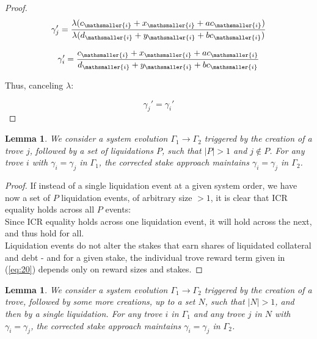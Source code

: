 \documentclass[reqno]{article}
\newtheorem{lemma}[theorem]{Lemma}
\begin{document}
\begin{proof}
\begin{equation} 
    \gamma_{j}'=\frac{\lambda(c_\mathsmaller{i} + x_\mathsmaller{i}+ac_\mathsmaller{i})}{\lambda(d_\mathsmaller{i}+y_\mathsmaller{i}+bc_\mathsmaller{i})}
\end{equation}

\begin{equation} 
    \gamma_{i}'=\frac{c_\mathsmaller{i}+x_\mathsmaller{i}+ac_\mathsmaller{i}}{d_\mathsmaller{i}+y_\mathsmaller{i}+bc_\mathsmaller{i}}
\end{equation}

\bigskip
Thus, canceling $\lambda$:

\begin{equation} 
    \gamma_{j}'=\gamma_{i}'
\end{equation}

\end{proof}

\begin{lemma} \label{result:2} We consider a system evolution $\Gamma_1 \rightarrow \Gamma_2$ triggered by the creation of a trove $j$, followed by a set of liquidations $P$, such that $|P| > 1$ and $j \notin P$. For any trove $i$ with $\gamma_i = \gamma_j$ in $\Gamma_1$, the corrected stake approach maintains $\gamma_i = \gamma_j$ in $\Gamma_2$.
\end{lemma}

\begin{proof}
If instead of a single liquidation event at a given system order, we have now a set of $P$ liquidation events, of arbitrary size $> 1$, it is clear that ICR equality holds across all $P$ events:\\

Since ICR equality holds across one liquidation event, it will hold across the next, and thus hold for all.\\

Liquidation events do not alter the stakes that earn shares of liquidated collateral and debt - and for a given stake, the individual trove reward term given in (\ref{eq:20}) depends only on reward sizes and stakes.
\end{proof}

\begin{lemma} \label{result:3}
  We consider a system evolution $\Gamma_1 \rightarrow \Gamma_2$ triggered by the creation of a trove, followed by some more creations, up to a set $N$, such that $|N| > 1$, and then by a single liquidation. For any trove $i$ in $\Gamma_1$ and any trove $j$ in $N$ with $\gamma_i = \gamma_j$, the corrected stake approach maintains $\gamma_i = \gamma_j$ in $\Gamma_2$.
\end{lemma}
\end{document}
